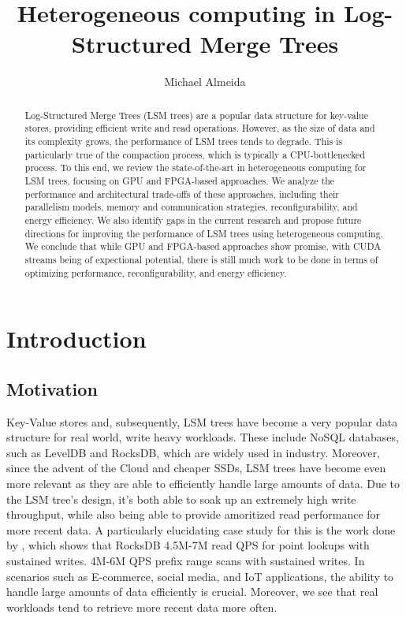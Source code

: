 \documentclass[sigconf]{acmart}
\title{Heterogeneous computing in Log-Structured Merge Trees}
\author{Michael Almeida}
\affiliation{
  \institution{Harvard University}
  \city{Cambridge} \state{Massachusets} \country{USA}
}
\begin{document}
\begin{abstract}
Log-Structured Merge Trees (LSM trees) are a popular data structure for
key-value stores, providing efficient write and read operations.
However, as the size of data and its complexity grows, the performance of LSM trees tends to degrade.
This is particularly true of the compaction process, which is typically a CPU-bottlenecked process.
To this end, we review the state-of-the-art in heterogeneous computing for LSM trees, focusing on GPU and FPGA-based approaches.
We analyze the performance and architectural trade-offs of these approaches, including their parallelism models, memory and communication strategies, reconfigurability, and energy efficiency.
We also identify gaps in the current research and propose future directions for improving the performance of LSM trees using heterogeneous computing.
We conclude that while GPU and FPGA-based approaches show promise, with CUDA streams being of expectional potential, there is still much work to be done in terms of optimizing performance, reconfigurability, and energy efficiency.
\end{abstract}
\maketitle

\section{Introduction}
  \subsection{Motivation}
   Key-Value stores and, subsequently, LSM trees have become a very popular data structure for real world, write heavy workloads. These include NoSQL databases, such as LevelDB and RocksDB, which are widely used in industry.
    Moreover, since the advent of the Cloud and cheaper SSDs, LSM trees have become even more relevant as they are able to efficiently handle large amounts of data.
    Due to the LSM tree's design, it's both able to soak up an extremely high write throughput, while also being able to provide amoritized read performance for more recent data.
    A particularly elucidating case study for this is the work done by \cite{rocksdb}, which shows that RocksDB 4.5M-7M read QPS for point lookups with sustained writes. 4M-6M QPS prefix range scans with sustained writes.
    In scenarios such as E-commerce, social media, and IoT applications, the ability to handle large amounts of data efficiently is crucial. Moreover, we see that real workloads tend to retrieve more recent data more often.
\end{document}
